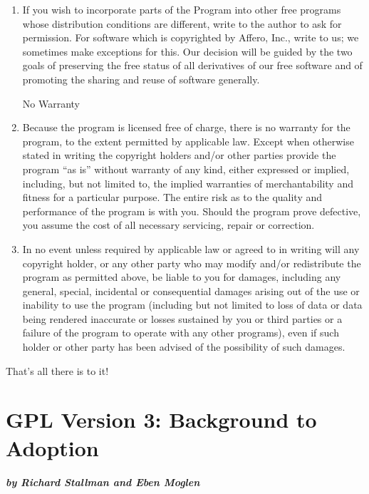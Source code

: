 \documentclass[11pt, letterpaper]{book}
\begin{document}
\begin{enumerate}
\item
If you wish to incorporate parts of the Program into other free
programs whose distribution conditions are different, write to the
author to ask for permission. For software which is copyrighted by
Affero, Inc., write to us; we sometimes make exceptions for this. Our
decision will be guided by the two goals of preserving the free status
of all derivatives of our free software and of promoting the sharing
and reuse of software generally.

\begin{center}
{\Large\sc
No Warranty
}
\end{center}

\item
{\sc Because the program is licensed free of charge, there is no warranty
for the program, to the extent permitted by applicable law.  Except when
otherwise stated in writing the copyright holders and/or other parties
provide the program ``as is'' without warranty of any kind, either expressed
or implied, including, but not limited to, the implied warranties of
merchantability and fitness for a particular purpose.  The entire risk as
to the quality and performance of the program is with you.  Should the
program prove defective, you assume the cost of all necessary servicing,
repair or correction.}

\item
{\sc In no event unless required by applicable law or agreed to in writing
will any copyright holder, or any other party who may modify and/or
redistribute the program as permitted above, be liable to you for damages,
including any general, special, incidental or consequential damages arising
out of the use or inability to use the program (including but not limited
to loss of data or data being rendered inaccurate or losses sustained by
you or third parties or a failure of the program to operate with any other
programs), even if such holder or other party has been advised of the
possibility of such damages.}

\end{enumerate}

That's all there is to it!

\chapter{GPL Version 3: Background to Adoption}

\textbf{\textit{\large{by Richard Stallman and Eben Moglen}}}
\end{document}
